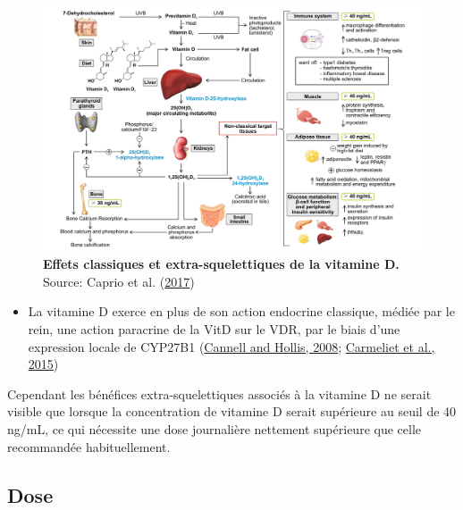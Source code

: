 \documentclass[
  letterpaper,
  DIV=11,
  numbers=noendperiod]{scrartcl}
\providecommand{\tightlist}{%
  \setlength{\itemsep}{0pt}\setlength{\parskip}{0pt}}\usepackage{longtable,booktabs,array}
\begin{document}
\begin{figure}

{\centering \includegraphics{figures/extra-skeletal-effect.png}

}

\caption{\label{fig-extra-skeletal}\textbf{Effets classiques et
extra-squelettiques de la vitamine D.} Source: Caprio et al.
(\protect\hyperlink{ref-Caprio.2017}{2017})}

\end{figure}

\begin{itemize}
\tightlist
\item
  La vitamine D exerce en plus de son action endocrine classique, médiée
  par le rein, une action paracrine de la VitD sur le VDR, par le biais
  d'une expression locale de CYP27B1
  (\protect\hyperlink{ref-Cannell.2008}{Cannell and Hollis, 2008};
  \protect\hyperlink{ref-Carmeliet.2015}{Carmeliet et al., 2015})
\end{itemize}

Cependant les bénéfices extra-squelettiques associés à la vitamine D ne
serait visible que lorsque la concentration de vitamine D serait
supérieure au seuil de 40 ng/mL, ce qui nécessite une dose journalière
nettement supérieure que celle recommandée habituellement.

\hypertarget{dose}{%
\subsection{Dose}\label{dose}}
\end{document}
